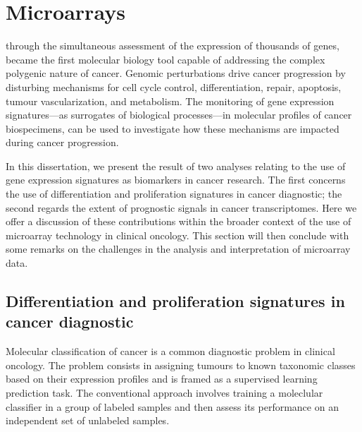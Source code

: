 \section{Microarrays}
\label{microarray-discussion}


 through the simultaneous assessment of the
expression of thousands of genes, became the first molecular biology tool
capable of addressing the complex polygenic nature of
cancer.\cite{grant_microarrays_2004} Genomic perturbations drive cancer
progression by disturbing mechanisms for cell cycle control, differentiation,
 repair, apoptosis, tumour vascularization, and metabolism.  The
monitoring of gene expression signatures---as surrogates of biological
processes---in molecular profiles of cancer biospecimens, can be used to
investigate how these mechanisms are impacted during cancer progression.


In this dissertation, we present the result of two analyses relating to the use
of gene expression signatures as biomarkers in cancer research.  The first
concerns the use of differentiation and proliferation signatures in cancer
diagnostic; the second regards the extent of prognostic signals in cancer
transcriptomes.  Here we offer a discussion of these contributions within the
broader context of the use of microarray technology in clinical oncology.  This
section will then conclude with some remarks on the challenges in the analysis
and interpretation of microarray data.

\subsection{Differentiation and proliferation signatures in cancer diagnostic}
\label{discussion-differentiation-microarrays}
Molecular classification of cancer is a common diagnostic problem in clinical
oncology.\cite{golub_molecular_1999,alizadeh_distinct_2000,bullinger_use_2004}
The problem consists in assigning tumours to known taxonomic classes based on
their expression profiles and is framed as a supervised learning prediction
task.  The conventional approach involves training a moleclular classifier in a
group of labeled samples and then assess its performance on an independent set
of unlabeled samples.\cite{golub_molecular_1999}

